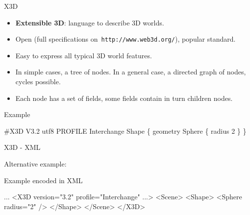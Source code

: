 \documentclass{beamer}
\begin{document}
\begin{frame}[fragile]{X3D}

\begin{itemize}
  \item \textbf{Extensible 3D}: language to describe 3D worlds.
  \item Open (full specifications on~\texttt{http://www.web3d.org/}), popular standard.
  \item Easy to express all typical 3D world features.
  \item In simple cases, a tree of nodes.
    In a general case, a directed graph of nodes, cycles possible.
  \item Each node has a set of fields, some fields contain in turn children nodes.
\end{itemize}

\begin{exampleblock}{Example}
\begin{semiverbatim}
\#X3D V3.2 utf8
PROFILE Interchange
Shape \{
  geometry Sphere \{ radius 2 \}
\}
\end{semiverbatim}
\end{exampleblock}
\end{frame}

\begin{frame}[fragile]{X3D - XML}

Alternative example:

\begin{exampleblock}{Example encoded in XML}
\begin{semiverbatim}
...
<X3D version="3.2" profile="Interchange" ...>
  <Scene>
    <Shape>
      <Sphere radius="2" />
    </Shape>
  </Scene>
</X3D>
\end{semiverbatim}
\end{exampleblock}

\end{frame}
\end{document}

